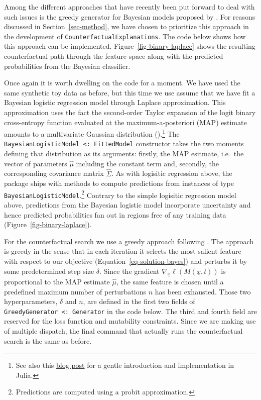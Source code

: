\documentclass[
  letterpaper,
  DIV=11,
  numbers=noendperiod]{scrartcl}
\begin{document}
Among the different approaches that have recently been put forward to
deal with such issues is the greedy generator for Bayesian models
proposed by \cite{schut2021generating}. For reasons discussed in
Section~\ref{sec-method}, we have chosen to prioritize this approach in
the development of \texttt{CounterfactualExplanations}. The code below
shows how this approach can be implemented.
Figure~\ref{fig-binary-laplace} shows the resulting counterfactual path
through the feature space along with the predicted probabilities from
the Bayesian classifier.

Once again it is worth dwelling on the code for a moment. We have used
the same synthetic toy data as before, but this time we use assume that
we have fit a Bayesian logistic regression model through Laplace
approximation. This approximation uses the fact the second-order Taylor
expansion of the logit binary cross-entropy function evaluated at the
maximum-a-posteriori (MAP) estimate amounts to a multivariate Gaussian
distribution (\cite{murphy2022probabilistic}).\footnote{See also this
  \href{https://www.paltmeyer.com/blog/posts/effortsless-bayesian-dl/}{blog
  post} for a gentle introduction and implementation in Julia.} The
\texttt{BayesianLogisticModel\ \textless{}:\ FittedModel} constructor
takes the two moments defining that distribution as its arguments:
firstly, the MAP esitmate, i.e.~the vector of parameters \(\hat\mu\)
including the constant term and, secondly, the corresponding covariance
matrix \(\hat{\Sigma}\). As with logisitic regression above, the package
ships with methods to compute predictions from instances of type
\texttt{BayesianLogisticModel}.\footnote{Predictions are computed using
  a probit approximation.} Contrary to the simple logisitic regression
model above, predictions from the Bayesian logistic model incorporate
uncertainty and hence predicted probabilities fan out in regions free of
any training data (Figure~\ref{fig-binary-laplace}).

For the counterfactual search we use a greedy approach following
\cite{schut2021generating}. The approach is greedy in the sense that in
each iteration it selects the most salient feature with respect to our
objective (Equation~\ref{eq-solution-bayes}) and perturbs it by some
predetermined step size \(\delta\). Since the gradient
\(\nabla_{\underline{x}}\ell(M(\underline{x},t))\) is proportional to
the MAP estimate \(\hat\mu\), the same feature is chosen until a
predefined maximum number of perturbations \(n\) has been exhausted.
Those two hyperparameters, \(\delta\) and \(n\), are defined in the
first two fields of \texttt{GreedyGenerator\ \textless{}:\ Generator} in
the code below. The third and fourth field are reserved for the loss
function and mutability constraints. Since we are making use of multiple
dispatch, the final command that actually runs the counterfactual search
is the same as before.
\end{document}

